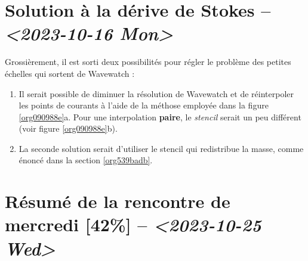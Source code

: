\documentclass[10pt]{article}
\numberwithin{equation}{section}
\begin{document}
\section{Solution à la dérive de Stokes -- \textit{<2023-10-16 Mon>}}
\label{sec:org28b0c43}
Grossièrement, il est sorti deux possibilités pour régler le problème des petites échelles qui sortent de Wavewatch :
\begin{enumerate}
\item Il serait possible de diminuer la résolution de Wavewatch et de réinterpoler les points de courants à l'aide de la méthose employée dans la figure \ref{org090988e}a.
Pour une interpolation \textbf{paire}, le \emph{stencil} serait un peu différent (voir figure \ref{org090988e}b).

\item La seconde solution serait d'utiliser le stencil qui redistribue la masse, comme énoncé dans la section \ref{org539badb}.
\end{enumerate}
\section{Résumé de la rencontre de mercredi [42\%]  -- \textit{<2023-10-25 Wed>}}
\label{sec:orgb67310f}
\end{document}
